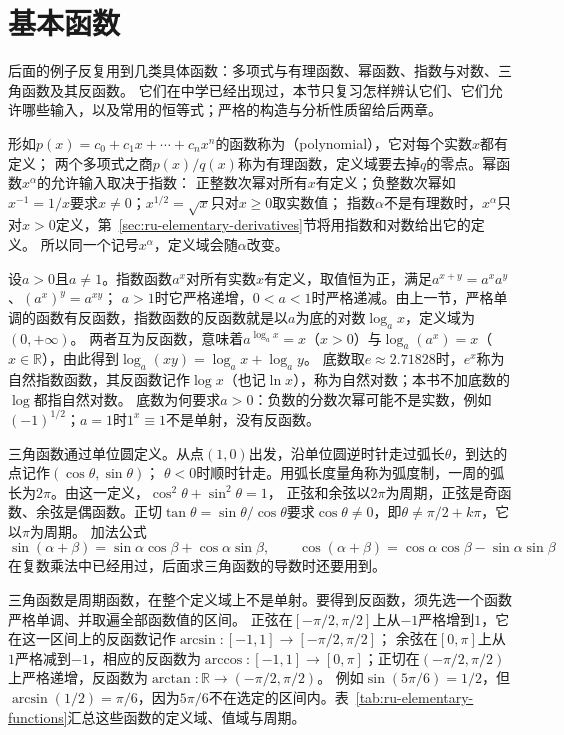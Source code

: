 \section{基本函数}
\label{sec:ru-elementary-functions}

后面的例子反复用到几类具体函数：多项式与有理函数、幂函数、指数与对数、三角函数及其反函数。
它们在中学已经出现过，本节只复习怎样辨认它们、它们允许哪些输入，以及常用的恒等式；严格的构造与分析性质留给后两章。

形如$p(x)=c_0+c_1x+\cdots+c_nx^n$的函数称为（polynomial），它对每个实数$x$都有定义；
两个多项式之商$p(x)/q(x)$称为有理函数，定义域要去掉$q$的零点。幂函数$x^\alpha$的允许输入取决于指数：
正整数次幂对所有$x$有定义；负整数次幂如$x^{-1}=1/x$要求$x\neq0$；$x^{1/2}=\sqrt x$只对$x\geq0$取实数值；
指数$\alpha$不是有理数时，$x^\alpha$只对$x>0$定义，第~\ref{sec:ru-elementary-derivatives}节将用指数和对数给出它的定义。
所以同一个记号$x^\alpha$，定义域会随$\alpha$改变。

设$a>0$且$a\neq1$。指数函数$a^x$对所有实数$x$有定义，取值恒为正，满足$a^{x+y}=a^xa^y$、$(a^x)^y=a^{xy}$；
$a>1$时它严格递增，$0<a<1$时严格递减。由上一节，严格单调的函数有反函数，指数函数的反函数就是以$a$为底的对数$\log_ax$，定义域为$(0,+\infty)$。
两者互为反函数，意味着$a^{\log_ax}=x$（$x>0$）与$\log_a(a^x)=x$（$x\in\mathbb R$），由此得到$\log_a(xy)=\log_ax+\log_ay$。
底数取$e\approx2.71828$时，$e^x$称为自然指数函数，其反函数记作$\log x$（也记$\ln x$），称为自然对数；本书不加底数的$\log$都指自然对数。
底数为何要求$a>0$：负数的分数次幂可能不是实数，例如$(-1)^{1/2}$；$a=1$时$1^x\equiv1$不是单射，没有反函数。

三角函数通过单位圆定义。从点$(1,0)$出发，沿单位圆逆时针走过弧长$\theta$，到达的点记作$(\cos\theta,\sin\theta)$；
$\theta<0$时顺时针走。用弧长度量角称为弧度制，一周的弧长为$2\pi$。由这一定义，$\cos^2\theta+\sin^2\theta=1$，
正弦和余弦以$2\pi$为周期，正弦是奇函数、余弦是偶函数。正切$\tan\theta=\sin\theta/\cos\theta$要求$\cos\theta\neq0$，即$\theta\neq\pi/2+k\pi$，它以$\pi$为周期。
加法公式
\[
 \sin(\alpha+\beta)=\sin\alpha\cos\beta+\cos\alpha\sin\beta,\qquad
 \cos(\alpha+\beta)=\cos\alpha\cos\beta-\sin\alpha\sin\beta
\]
在复数乘法中已经用过，后面求三角函数的导数时还要用到。

三角函数是周期函数，在整个定义域上不是单射。要得到反函数，须先选一个函数严格单调、并取遍全部函数值的区间。
正弦在$[-\pi/2,\pi/2]$上从$-1$严格增到$1$，它在这一区间上的反函数记作$\arcsin:[-1,1]\to[-\pi/2,\pi/2]$；
余弦在$[0,\pi]$上从$1$严格减到$-1$，相应的反函数为$\arccos:[-1,1]\to[0,\pi]$；正切在$(-\pi/2,\pi/2)$上严格递增，反函数为$\arctan:\mathbb R\to(-\pi/2,\pi/2)$。
例如$\sin(5\pi/6)=1/2$，但$\arcsin(1/2)=\pi/6$，因为$5\pi/6$不在选定的区间内。表~\ref{tab:ru-elementary-functions}汇总这些函数的定义域、值域与周期。

